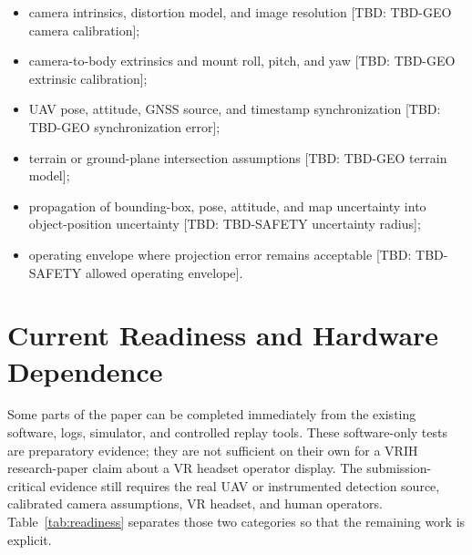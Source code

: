 \documentclass[11pt,a4paper]{article}
\newcommand{\tbd}[1]{\textcolor{publicationred}{[TBD: #1]}}
\begin{document}
\begin{itemize}
    \item camera intrinsics, distortion model, and image resolution \tbd{TBD-GEO camera calibration};
    \item camera-to-body extrinsics and mount roll, pitch, and yaw \tbd{TBD-GEO extrinsic calibration};
    \item UAV pose, attitude, GNSS source, and timestamp synchronization \tbd{TBD-GEO synchronization error};
    \item terrain or ground-plane intersection assumptions \tbd{TBD-GEO terrain model};
    \item propagation of bounding-box, pose, attitude, and map uncertainty into object-position uncertainty \tbd{TBD-SAFETY uncertainty radius};
    \item operating envelope where projection error remains acceptable \tbd{TBD-SAFETY allowed operating envelope}.
\end{itemize}

\section{Current Readiness and Hardware Dependence}

Some parts of the paper can be completed immediately from the existing software, logs, simulator, and controlled replay tools. These software-only tests are preparatory evidence; they are not sufficient on their own for a VRIH research-paper claim about a VR headset operator display. The submission-critical evidence still requires the real UAV or instrumented detection source, calibrated camera assumptions, VR headset, and human operators. Table~\ref{tab:readiness} separates those two categories so that the remaining work is explicit.
\end{document}
